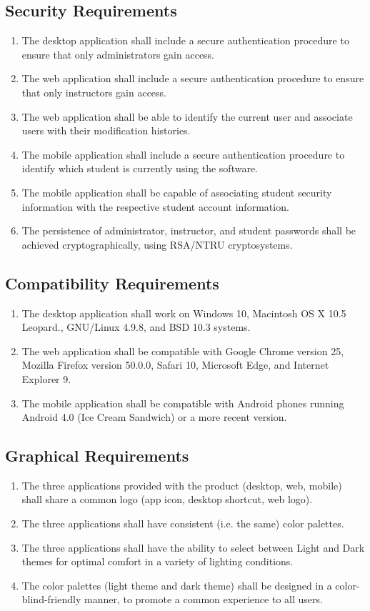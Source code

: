 \documentclass[12pt,openany]{report}
\begin{document}
\subsection{Security Requirements}
\begin{enumerate}[\thesubsection .1]
	\item The desktop application shall include a secure authentication procedure to ensure that only administrators gain access.
	\item The web application shall include a secure authentication procedure to ensure that only instructors gain access.
	\item The web application shall be able to identify the current user and associate users with their modification histories.
	\item The mobile application shall include a secure authentication procedure to identify which student is currently using the software. 
	\item The mobile application shall be capable of associating student security information with the respective student account information.
	\item The persistence of administrator, instructor, and student passwords shall be achieved cryptographically, using RSA/NTRU cryptosystems.
\end{enumerate}

\subsection{Compatibility Requirements}
\begin{enumerate}[\thesubsection .1]
	\item The desktop application shall work on Windows 10, Macintosh OS X 10.5 Leopard., GNU/Linux 4.9.8, and BSD 10.3 systems.
	\item The web application shall be compatible with Google Chrome version 25, Mozilla Firefox version 50.0.0, Safari 10, Microsoft Edge, and Internet Explorer 9.
	\item The mobile application shall be compatible with Android phones running Android 4.0 (Ice Cream Sandwich) or a more recent version.
\end{enumerate}
\subsection{Graphical Requirements}
\begin{enumerate}[\thesubsection .1]
	\item The three applications provided with the product (desktop, web, mobile) shall share a common logo (app icon, desktop shortcut, web logo).
	\item The three applications shall have consistent (i.e. the same) color palettes.
	\item The three applications shall have the ability to select between Light and Dark themes for optimal comfort in a variety of lighting conditions.
	\item The color palettes (light theme and dark theme) shall be designed in a color-blind-friendly manner, to promote a common experience to all users. %
\end{enumerate}
\end{document}
